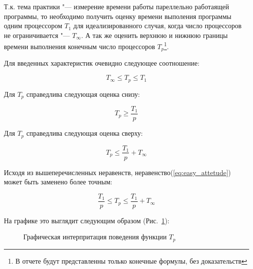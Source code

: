 \documentclass{article}
\begin{document}
			Т.к. тема практики "--- измерение времени работы пареллельно работаящей программы, то необходимо получить оценку    			времени выполения программы одним процессором $T_1$  для идеализированного случая, когда число процессоров не 						ограничивается "--- $T_\infty$. А так же оценить верхнюю и нижнюю границы времени выполнения конечным число процессоров 			$T_p$\footnote{В отчете будут представленны только конечные формулы, без доказательств}.
						
		Для введенных характеристик очевидно следующее соотношение:

		\begin{equation}
			\label{eq:easy_attetude}
			T_\infty \le T_p \le T_1
		\end{equation}
			
		Для $T_p$ справедлива следующая оценка снизу:
			
		\begin{equation}
			\label{eq:lower_bound}
			T_p \ge \frac{T_1}{p}
		\end{equation}
			
		Для $T_p$ справедлива следующая оценка сверху:
			
		\begin{equation}
			\label{eq:upper_bound}
			T_p \le \frac{T_1}{p} + T_\infty
		\end{equation}
			
		Исходя из вышеперечисленных неравенств, неравенство(\ref{eq:easy_attetude}) может быть заменено более точным:
			
		\begin{equation}
			\label{eq:attetude}
			\frac{T_1}{p} \le T_p \le \frac{T_1}{p} + T_\infty
		\end{equation}
			
		\newpage

		На графике это выглядит следующим образом (Рис.~\ref{ris:graph_attetude}):
			
		\begin{figure}[h!]
			\caption{Графическая интерпритация поведения функции $T_p$}
			\label{ris:graph_attetude}
		\end{figure}
						
\end{document}

